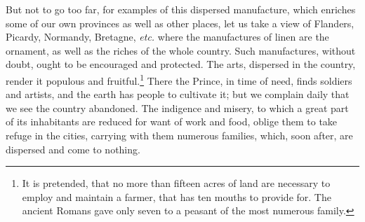 \documentclass[a4paper, 11pt, oneside, polutonikogreek, english]{article}
\begin{document}
But not to go too far, for examples of this dispersed manufacture, which enriches some of our own provinces as well as other places, let us take a view of Flanders, Picardy, Normandy, Bretagne, \emph{etc.} where the manufactures of linen are the ornament, as well as the riches of the whole country. Such manufactures, without doubt, ought to be encouraged and protected. The arts, dispersed in the country, render it populous and fruitful.\footnote{It is pretended, that no more than fifteen acres of land are necessary to employ and maintain a farmer, that has ten mouths to provide for. The ancient Romans gave only seven to a peasant of the most numerous family.} There the Prince, in time of need, finds soldiers and artists, and the earth has people to cultivate it; but we complain daily that we see the country abandoned. The indigence and misery, to which a great part of its inhabitants are reduced for want of work and food, oblige them to take refuge in the cities, carrying with them numerous families, which, soon after, are dispersed and come to nothing.
\end{document}
